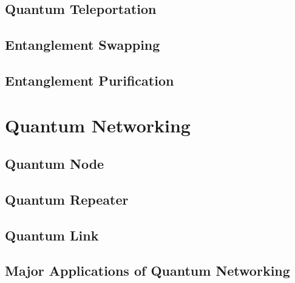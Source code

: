 \subsection{Quantum Teleportation}
\subsection{Entanglement Swapping}
\subsection{Entanglement Purification}

\section{Quantum Networking}
\subsection{Quantum Node}
\subsection{Quantum Repeater}
\subsection{Quantum Link}
\subsection{Major Applications of Quantum Networking}

